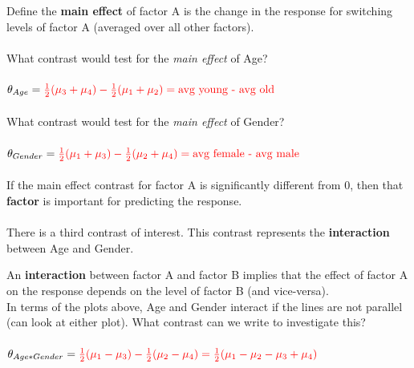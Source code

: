 Define the \textbf{main effect} of factor A is the change in the response for switching levels of factor A (averaged over all other factors).\\~\\
What contrast would test for the \textit{main effect} of Age?\\~\\
$\theta_{Age} = \textcolor{red}{\frac{1}{2}(\mu_3+\mu_4)-\frac{1}{2}(\mu_1+\mu_2)=\mbox{avg young - avg old}}$\\~\\
What contrast would test for the \textit{main effect} of Gender?\\~\\
$\theta_{Gender} = \textcolor{red}{\frac{1}{2}(\mu_1+\mu_3)-\frac{1}{2}(\mu_2+\mu_4)=\mbox{avg female - avg male}}$\\~\\
If the main effect contrast for factor A is significantly different from 0, then that \textbf{factor} is important for predicting the response. \\~\\
There is a third contrast of interest.  This contrast represents the \textbf{interaction} between Age and Gender.

\newpage

An \textbf{interaction} between factor A and factor B implies that the effect of factor A on the response depends on the level of factor B (and vice-versa).\\

In terms of the plots above, Age and Gender interact if the lines are not parallel (can look at either plot).  What contrast can we write to investigate this?\\~\\
$\theta_{Age*Gender} = \textcolor{red}{\frac{1}{2}(\mu_1-\mu_3)-\frac{1}{2}(\mu_2-\mu_4)=\frac{1}{2}(\mu_1-\mu_2-\mu_3+\mu_4)}$\\~\\

